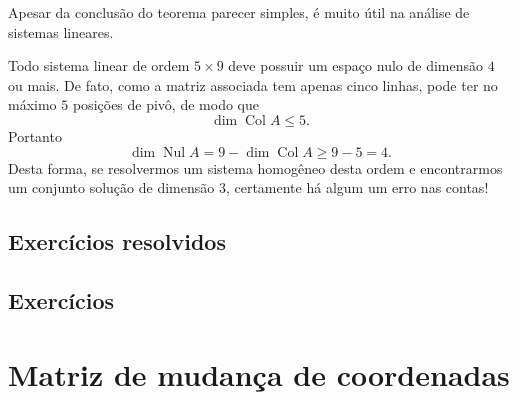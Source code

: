 Apesar da conclusão do teorema parecer simples, é muito útil na análise de sistemas lineares.

\begin{ex}
	Todo sistema linear de ordem $5 \times 9$ deve possuir um espaço nulo de dimensão $4$ ou mais. De fato, como a matriz associada tem apenas cinco linhas, pode ter no máximo $5$ posições de pivô, de modo que
	\begin{equation}
	\operatorname{dim} \operatorname{Col} A \le 5.
	\end{equation} Portanto
	\begin{equation}
	\operatorname{dim} \operatorname{Nul} A = 9 - \operatorname{dim} \operatorname{Col} A \ge 9 - 5 = 4.
	\end{equation} Desta forma, se resolvermos um sistema homogêneo desta ordem e encontrarmos um conjunto solução de dimensão 3, certamente  há algum um erro nas contas!
\end{ex}












\subsection*{Exercícios resolvidos}

\construirExeresol

\subsection*{Exercícios}

\construirExer



\section{Matriz de mudança de coordenadas}

